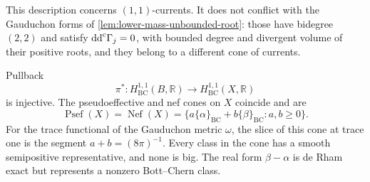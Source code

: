 This description concerns $(1,1)$-currents. It does not conflict with the Gauduchon forms of \cref{lem:lower-mass-unbounded-root}: those have bidegree $(2,2)$ and satisfy $\mathrm{dd}^{\mathrm{c}}\Gamma_j=0$, with bounded degree and divergent volume of their positive roots, and they belong to a different cone of currents.

\begin{proposition}\label{prop:elliptic-bott-chern-cones}
Pullback
\[
 \pi^*\colon H^{1,1}_{\mathrm{BC}}(B,\mathbb R)
           \longrightarrow H^{1,1}_{\mathrm{BC}}(X,\mathbb R)
\]
is injective. The pseudoeffective and nef cones on $X$ coincide and are
\[
 \operatorname{Psef}(X)=\operatorname{Nef}(X)
 =\{a\{\alpha\}_{\mathrm{BC}}+b\{\beta\}_{\mathrm{BC}}:
                                           a,b\geq0\}.
\]
For the trace functional of the Gauduchon metric $\omega$, the slice of this cone at trace one is the segment $a+b=(8\pi)^{-1}$. Every class in the cone has a smooth semipositive representative, and none is big. The real form $\beta-\alpha$ is de Rham exact but represents a nonzero Bott--Chern class.
\end{proposition}
